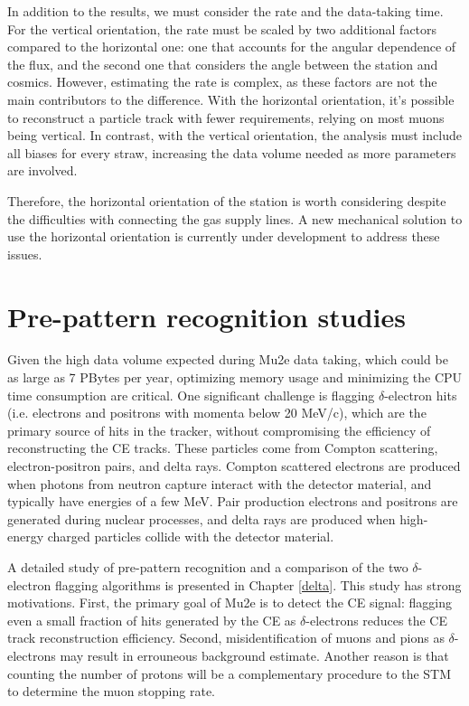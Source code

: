In addition to the results, we must consider the rate and the data-taking time. 
For the vertical orientation, the rate must be scaled by two additional 
factors compared to the horizontal one: one that accounts for the 
angular dependence of the flux, and the second one that considers the angle between the station and cosmics. 
However, estimating the rate is complex, as these factors are not the main contributors to the difference. 
With the horizontal orientation, it's possible to reconstruct a particle track with 
fewer requirements, relying on most muons being vertical. In contrast, with the 
vertical orientation, the analysis must include all biases for every straw, increasing 
the data volume needed as more parameters are involved.

Therefore, the horizontal orientation of the station is worth considering despite the difficulties
with connecting the gas supply lines.
A new mechanical solution to use the horizontal orientation is currently under development to address these issues.




\section{Pre-pattern recognition studies}

Given the high data volume expected during Mu2e data taking, 
which could be as large as 7 PBytes per year,
optimizing memory usage and minimizing the CPU time consumption are critical.
One significant challenge is flagging $\delta$-electron hits (i.e. electrons and positrons 
with momenta below 20 MeV/c), which are the primary source 
of hits in the tracker, without compromising the efficiency of 
reconstructing the CE tracks. These particles come from Compton 
scattering, electron-positron pairs, 
and delta rays. Compton scattered electrons 
are produced when photons from neutron capture interact with the 
detector material, and typically have energies of a few MeV.
Pair production electrons and positrons 
are generated during nuclear processes, 
and delta rays are produced 
when high-energy charged particles collide with the detector material.

A detailed study of pre-pattern recognition and a comparison of the two 
$\delta$-electron flagging algorithms is presented 
in Chapter \ref{delta}. This study has strong motivations. First, the primary goal of Mu2e is 
to detect the CE signal: flagging even a small fraction of hits generated 
by the CE as $\delta$-electrons reduces the CE track 
reconstruction efficiency. Second, misidentification of muons 
and pions as $\delta$-electrons may result in errouneous background estimate. 
Another reason is that counting the number of protons will be a complementary procedure to the 
STM to determine the muon stopping rate.


